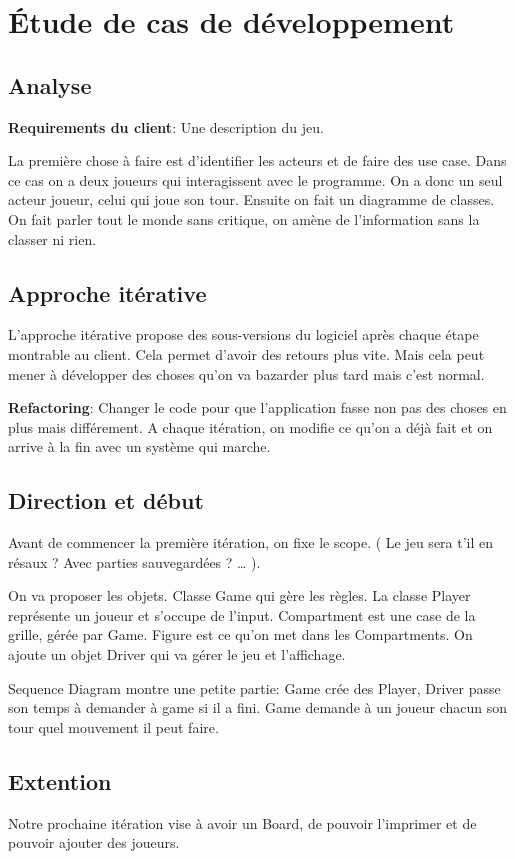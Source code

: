 \section{Étude de cas de développement}

\subsection{Analyse}
\textbf{Requirements du client}: Une description du jeu.

La première chose à faire est d’identifier les acteurs et de faire des use case. Dans ce cas on a deux joueurs qui interagissent avec le programme. On a donc un seul acteur joueur, celui qui joue son tour.
Ensuite on fait un diagramme de classes. On fait parler tout le monde sans critique, on amène de l’information sans la classer ni rien.

\subsection{Approche itérative}
L’approche itérative propose des sous-versions du logiciel après chaque étape montrable au client. Cela permet d’avoir des retours plus vite. Mais cela peut mener à développer des choses qu’on va bazarder plus tard mais c’est normal.

\textbf{Refactoring}: Changer le code pour que l’application fasse non pas des choses en plus mais différement.
A chaque itération, on modifie ce qu’on a déjà fait et on arrive à la fin avec un système qui marche.

\subsection{Direction et début}
Avant de commencer la première itération, on fixe le scope. ( Le jeu sera t’il en résaux ? Avec parties sauvegardées ? … ).

On va proposer les objets. Classe Game qui gère les règles. La classe Player représente un joueur et s’occupe de l’input. Compartment est une case de la grille, gérée par Game. Figure est ce qu’on met dans les Compartments. On ajoute un objet Driver qui va gérer le jeu et l’affichage.

Sequence Diagram montre une petite partie: Game crée des Player, Driver passe son temps à demander à game si il a fini. Game demande à un joueur chacun son tour quel mouvement il peut faire.
\subsection{Extention}
Notre prochaine itération vise à avoir un Board, de pouvoir l’imprimer et de pouvoir ajouter des joueurs.

